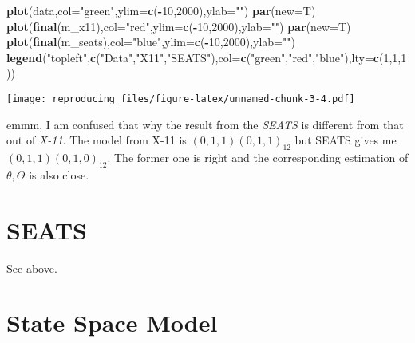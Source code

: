 \documentclass[]{article}
\newenvironment{Shaded}{\begin{snugshade}}{\end{snugshade}}
\newcommand{\DataTypeTok}[1]{\textcolor[rgb]{0.13,0.29,0.53}{#1}}
\newcommand{\DecValTok}[1]{\textcolor[rgb]{0.00,0.00,0.81}{#1}}
\newcommand{\KeywordTok}[1]{\textcolor[rgb]{0.13,0.29,0.53}{\textbf{#1}}}
\newcommand{\NormalTok}[1]{#1}
\newcommand{\OperatorTok}[1]{\textcolor[rgb]{0.81,0.36,0.00}{\textbf{#1}}}
\newcommand{\StringTok}[1]{\textcolor[rgb]{0.31,0.60,0.02}{#1}}
\begin{document}
\begin{Shaded}
\begin{Highlighting}[]
\KeywordTok{plot}\NormalTok{(data,}\DataTypeTok{col=}\StringTok{"green"}\NormalTok{,}\DataTypeTok{ylim=}\KeywordTok{c}\NormalTok{(}\OperatorTok{-}\DecValTok{10}\NormalTok{,}\DecValTok{2000}\NormalTok{),}\DataTypeTok{ylab=}\StringTok{""}\NormalTok{)}
\KeywordTok{par}\NormalTok{(}\DataTypeTok{new=}\NormalTok{T)}
\KeywordTok{plot}\NormalTok{(}\KeywordTok{final}\NormalTok{(m_x11),}\DataTypeTok{col=}\StringTok{"red"}\NormalTok{,}\DataTypeTok{ylim=}\KeywordTok{c}\NormalTok{(}\OperatorTok{-}\DecValTok{10}\NormalTok{,}\DecValTok{2000}\NormalTok{),}\DataTypeTok{ylab=}\StringTok{""}\NormalTok{)}
\KeywordTok{par}\NormalTok{(}\DataTypeTok{new=}\NormalTok{T)}
\KeywordTok{plot}\NormalTok{(}\KeywordTok{final}\NormalTok{(m_seats),}\DataTypeTok{col=}\StringTok{"blue"}\NormalTok{,}\DataTypeTok{ylim=}\KeywordTok{c}\NormalTok{(}\OperatorTok{-}\DecValTok{10}\NormalTok{,}\DecValTok{2000}\NormalTok{),}\DataTypeTok{ylab=}\StringTok{""}\NormalTok{)}
\KeywordTok{legend}\NormalTok{(}\StringTok{"topleft"}\NormalTok{,}\KeywordTok{c}\NormalTok{(}\StringTok{"Data"}\NormalTok{,}\StringTok{"X11"}\NormalTok{,}\StringTok{"SEATS"}\NormalTok{),}\DataTypeTok{col=}\KeywordTok{c}\NormalTok{(}\StringTok{"green"}\NormalTok{,}\StringTok{"red"}\NormalTok{,}\StringTok{"blue"}\NormalTok{),}\DataTypeTok{lty=}\KeywordTok{c}\NormalTok{(}\DecValTok{1}\NormalTok{,}\DecValTok{1}\NormalTok{,}\DecValTok{1}\NormalTok{))}
\end{Highlighting}
\end{Shaded}

\texttt{[image: reproducing\_files/figure-latex/unnamed-chunk-3-4.pdf]}

emmm, I am confused that why the result from the \emph{SEATS} is
different from that out of \emph{X-11}. The model from X-11 is
\((0,1,1)(0,1,1)_{12}\) but SEATS gives me \((0,1,1)(0,1,0)_{12}\). The
former one is right and the corresponding estimation of
\(\theta, \Theta\) is also close.

\hypertarget{seats}{%
\section{SEATS}\label{seats}}

See above.

\hypertarget{state-space-model}{%
\section{State Space Model}\label{state-space-model}}
\end{document}
